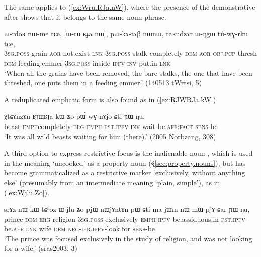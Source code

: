 The same applies to (\ref{ex:Wru.RJa.nW}), where the presence of the demonstrative  after  shows that it belongs to the same noun phrase.

\begin{exe}
\ex \label{ex:Wru.RJa.nW}
 \gll ɯ-rdoʁ nɯ-me tɕe, [ɯ-ru ʁɟa nɯ], pɯ-kɤ-tɤβ nɯnɯ, taʁndzɤr ɯ-ŋgɯ tú-wɣ-rku tɕe, \\
 \textsc{3sg}.\textsc{poss}-grain \textsc{aor}-not.exist \textsc{lnk} \textsc{3sg}.\textsc{poss}-stalk completely \textsc{dem} \textsc{aor}-\textsc{obj}:\textsc{pcp}-thresh \textsc{dem} feeding.emmer \textsc{3sg}.\textsc{poss}-inside \textsc{ipfv}-\textsc{inv}-put.in \textsc{lnk} \\
 \glt `When all the grains have been removed, the bare stalks, the one that have been threshed, one puts them in a feeding emmer.' (140513 tWrtsi, 5)
\end{exe}


A reduplicated emphatic form  is also found as in (\ref{ex:RJWRJa.kW})

\begin{exe}
\ex \label{ex:RJWRJa.kW}
 \gll χtɕɤnzɤn ʁɟɯ\redp{}ʁɟa kɯ ʑo pɯ́-wɣ-nɤjo ɕti ɲɯ-ŋu.  \\
beast \textsc{emph}\redp{}completely \textsc{erg} \textsc{emph} \textsc{pst}.\textsc{ipfv}-\textsc{inv}-wait be.\textsc{aff}:\textsc{fact} \textsc{sens}-be \\
\glt `It was all wild beasts waiting for him (there).' (2005 Norbzang, 308)
 \end{exe}
 
A third option to express restrictive focus is the inalienable noun , which is used in the meaning `uncooked' as a property noun (§\ref{sec:property.nouns}), but has become grammaticalized as a restrictive marker `exclusively, without anything else' (presumably from an intermediate meaning `plain, simple'), as in (\ref{ex:Wjlu.Zo}).

\begin{exe}
\ex \label{ex:Wjlu.Zo}
 \gll srɤz nɯ kɯ tɕʰoz ɯ-jlu ʑo pjɯ-nɯjɤntɤn pɯ-ɕti ma jɯm nɯ mɯ-pjɤ-ɕar ɲɯ-ŋu, \\
prince \textsc{dem} \textsc{erg}  religion \textsc{3sg}.\textsc{poss}-exclusively \textsc{emph} \textsc{ipfv}-be.assiduous.in  \textsc{pst}.\textsc{ipfv}-be.\textsc{aff} \textsc{lnk} wife \textsc{dem} \textsc{neg}-\textsc{ifr}.\textsc{ipfv}-look.for \textsc{sens}-be \\
 \glt `The prince was focused exclusively in the study of religion, and was not looking for a wife.' (sras2003, 3)
 \end{exe}

